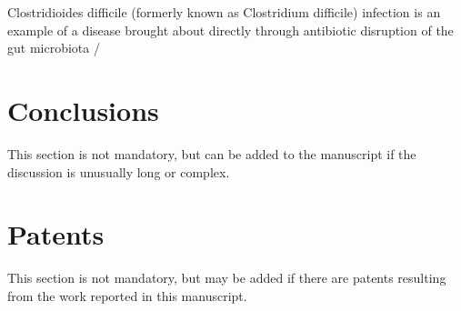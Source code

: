 \documentclass[biotech,article,submit,pdftex,moreauthors]{Definitions/mdpi}
\begin{document}
Clostridioides difficile (formerly known as Clostridium difficile) infection is an example of a disease brought about directly through antibiotic disruption of the gut microbiota /\cite{@theriotAntibioticinducedShiftsMouse2014}

\section{Conclusions}

This section is not mandatory, but can be added to the manuscript if the discussion is unusually long or complex.

\section{Patents}

This section is not mandatory, but may be added if there are patents resulting from the work reported in this manuscript.

\vspace{6pt} 



\end{document}

